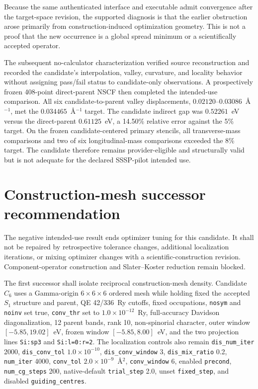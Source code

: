 \documentclass[11pt]{article}
\begin{document}
Because the same authenticated interface and executable admit convergence after the
target-space revision, the supported diagnosis is that the earlier obstruction arose
primarily from construction-induced optimization geometry.  This is not a proof that
the new occurrence is a global spread minimum or a scientifically accepted operator.

The subsequent no-calculator characterization verified source reconstruction and
recorded the candidate's interpolation, valley, curvature, and locality behavior without
assigning pass/fail status to candidate-only observations.  A prospectively frozen
408-point direct-parent NSCF then completed the intended-use comparison.  All six
candidate-to-parent valley displacements, $0.02120$--$0.03086$~\AA$^{-1}$, met the
$0.034465$~\AA$^{-1}$ target.  The candidate indirect gap was $0.52261$~eV versus the
direct-parent $0.61125$~eV, a 14.50\% relative error against the 5\% target.  On the
frozen candidate-centered primary stencils, all transverse-mass comparisons and two of
six longitudinal-mass comparisons exceeded the 8\% target.  The candidate therefore
remains provider-eligible and structurally valid but is not adequate for the declared
SSSP-pilot intended use.

\section{Construction-mesh successor recommendation}

The negative intended-use result ends optimizer tuning for this candidate.  It shall not
be repaired by retrospective tolerance changes, additional localization iterations, or
mixing optimizer changes with a scientific-construction revision.  Component-operator
construction and Slater--Koster reduction remain blocked.

The first successor shall isolate reciprocal construction-mesh density.  Candidate
$C_6$ uses a Gamma-origin $6\times6\times6$ ordered mesh while holding fixed the accepted
$S_1$ structure and parent, QE 42/336~Ry cutoffs, fixed occupations,
\texttt{nosym} and \texttt{noinv} set true, \texttt{conv\_thr} set to
$1.0\times10^{-12}$~Ry, full-accuracy Davidson diagonalization, 12 parent bands,
rank 10, non-spinorial character, outer window
$[-5.85,19.02]$~eV, frozen window $[-5.85,8.00]$~eV, and the two projection lines
\texttt{Si:sp3} and \texttt{Si:l=0:r=2}.  The localization controls also remain
\texttt{dis\_num\_iter} 2000, \texttt{dis\_conv\_tol} $1.0\times10^{-10}$,
\texttt{dis\_conv\_window} 3, \texttt{dis\_mix\_ratio} 0.2,
\texttt{num\_iter} 4000, \texttt{conv\_tol} $2.0\times10^{-9}$~\AA$^2$,
\texttt{conv\_window} 6, enabled \texttt{precond}, \texttt{num\_cg\_steps} 200,
native-default \texttt{trial\_step} 2.0, unset \texttt{fixed\_step}, and disabled
\texttt{guiding\_centres}.
\end{document}
